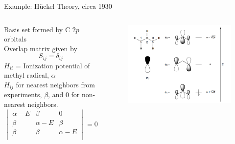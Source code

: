 \documentclass[aspectratio=169]{beamer}
\begin{document}
\begin{frame}{Example: H\"uckel Theory, circa 1930}
\begin{columns}
    Basis set formed by C 2$p$ orbitals\\
    Overlap matrix given by
    \begin{equation*}
        S_{ij} = \delta_{ij}
    \end{equation*}
    $H_{ii}$ = Ionization potential of methyl radical, $\alpha$\\
    $H_{ij}$ for nearest neighbors from experiments, $\beta$, and 0 for non-nearest neighbors.
    \begin{equation*}
    \begin{vmatrix}
    \alpha-E & \beta & 0\\
    \beta & \alpha-E & \beta\\
    \beta & \beta & \alpha-E\\
    \end{vmatrix}
    = 0
    \end{equation*}
    \begin{figure}
        \centering
        \includegraphics[width=\linewidth]{lectures/figures/2_alkene.png}
    \end{figure}
\end{columns}
\end{frame}
\end{document}
